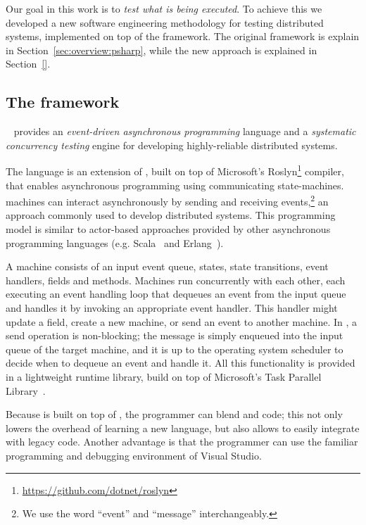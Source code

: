 Our goal in this work is to \emph{test what is being executed}. To achieve this we developed a new software engineering methodology for testing distributed systems, implemented on top of the \psharp framework. The original \psharp framework is explain in Section~\ref{sec:overview:psharp}, while the new approach is explained in Section~\ref{}.

\subsection{The \psharp framework}
\label{sec:method:psharp}

\psharp~\cite{deligiannis2015psharp} provides an \emph{event-driven asynchronous programming} language and a \emph{systematic concurrency testing} engine for developing highly-reliable distributed systems.

The \psharp language is an extension of \csharp, built on top of Microsoft's Roslyn\footnote{\url{https://github.com/dotnet/roslyn}} compiler, that enables asynchronous programming using communicating state-machines. \psharp machines can interact asynchronously by sending and receiving events,\footnote{We use the word ``event'' and ``message'' interchangeably.} an approach commonly used to develop distributed systems. This programming model is similar to actor-based approaches provided by other asynchronous programming languages (e.g. Scala~\cite{odersky2008programming} and Erlang~\cite{armstrong1996erlang}).

A \psharp machine consists of an input event queue, states, state transitions, event handlers, fields and methods. Machines run concurrently with each other, each executing an event handling loop that dequeues an event from the input queue and handles it by invoking an appropriate event handler. This handler might update a field, create a new machine, or send an event to another machine. In \psharp, a send operation is non-blocking; the message is simply enqueued into the input queue of the target machine, and it is up to the operating system scheduler to decide when to dequeue an event and handle it. All this functionality is provided in a lightweight runtime library, build on top of Microsoft's Task Parallel Library~\cite{leijen2009tpl}.

Because \psharp is built on top of \csharp, the programmer can blend \psharp and \csharp code; this not only lowers the overhead of learning a new language, but also allows \psharp to easily integrate with legacy code. Another advantage is that the programmer can use the familiar programming and debugging environment of Visual Studio.

